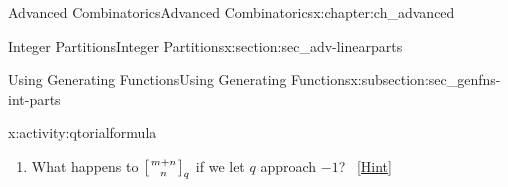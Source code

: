 \documentclass[oneside,10pt,]{book}
\numberwithin{equation}{chapter}
\newcommand{\qchoose}[2]{\left[{#1\atop#2}\right]_q}
\begin{document}
\begin{chapterptx}{Advanced Combinatorics}{}{Advanced Combinatorics}{}{}{x:chapter:ch_advanced}
\begin{sectionptx}{Integer Partitions}{}{Integer Partitions}{}{}{x:section:sec_adv-linearparts}
\begin{subsectionptx}{Using Generating Functions}{}{Using Generating Functions}{}{}{x:subsection:sec_genfns-int-parts}
\begin{activity}{}{x:activity:qtorialformula}
\begin{enumerate}[font=\bfseries,label=(\alph*),ref=\alph*]
\begin{enumerate}[label=(\roman*)]
\item{}\(\displaystyle\lim_{q\rightarrow 1} [n]_q\).%
\item{}\(\displaystyle\lim_{q\rightarrow 1} [n]!_q\).%
\item\hypertarget{x:li:q-binomial-lim}{}\(\displaystyle\lim_{q\rightarrow 1} \qchoose{m+n}{n}\).%
\end{enumerate}
Why is the limit in \hyperlink{x:li:q-binomial-lim}{Part~iii} equal to the number of partitions (of any number) with at most \(n\) parts all of size most \(m\)? Can you explain bijectively why this quantity equals the formula you got?%
\qquad~\hfill{\tiny\hyperlink{g:hint:idm8138-back}{[Hint]}}\item{}What happens to \(\qchoose{m+n}{n}\) if we let \(q\) approach \(-1\)?%
\qquad~\hfill{\tiny\hyperlink{g:hint:idm8167-back}{[Hint]}}\end{enumerate}
\end{activity}
\end{subsectionptx}
\end{sectionptx}
\end{chapterptx}
%
%
\typeout{************************************************}
\typeout{************************************************}
%
\end{document}
